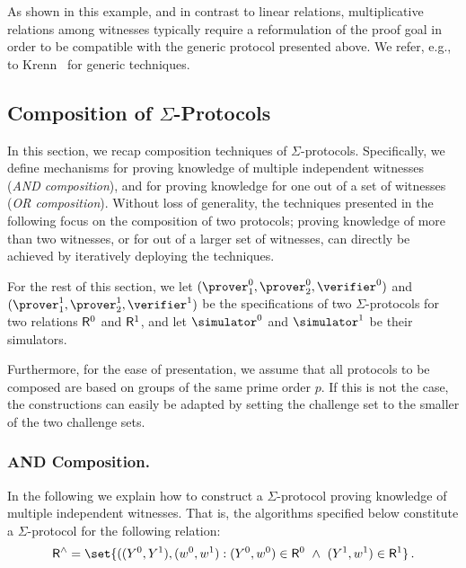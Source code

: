 \documentclass[runningheads]{llncs}
\begin{document}
As shown in this example, and in contrast to linear relations, multiplicative relations among witnesses typically require a reformulation of the proof goal in order to be compatible with the generic protocol presented above.
We refer, e.g., to Krenn~\cite{krenn12} for generic techniques.

\subsection{Composition of $\Sigma$-Protocols}
\label{sec:composition}
\label{sec:or-comp}
\label{sec:and-comp}
  In this section, we recap composition techniques of $\Sigma$-protocols.
  Specifically, we define mechanisms for proving knowledge of multiple independent witnesses (\emph{AND composition}), and for proving knowledge for one out of a set of witnesses (\emph{OR composition}).
  Without loss of generality, the techniques presented in the following focus on the composition of two protocols;
  proving knowledge of more than two witnesses, or for out of a larger set of witnesses, can directly be achieved by iteratively deploying the techniques.

  For the rest of this section, we let $(\prover_1^0,\prover_2^0,\verifier^0)$ and $(\prover_1^1,\prover_2^1,\verifier^1)$ be the specifications of two $\Sigma$-protocols for two relations $\mathsf{R}^0$ and $\mathsf{R}^1$, and let $\simulator^0$ and $\simulator^1$ be their simulators.

  Furthermore, for the ease of presentation, we assume that all protocols to be composed are based on groups of the same prime order $p$.
  If this is not the case, the constructions can easily be adapted by setting the challenge set to the smaller of the two challenge sets.

\subsubsection{AND Composition.}
  In the following we explain how to construct a $\Sigma$-protocol proving knowledge of multiple independent witnesses.
  That is, the algorithms specified below constitute a $\Sigma$-protocol for the following relation:
\[
  \relation^\land = \set{
    ((\statement^0,\statement^1),(\witness^0,\witness^1) : (\statement^0,\witness^0)\in \relation^0 ~\land~ (\statement^1,\witness^1)\in\relation^1}\,.
\]
\end{document}
